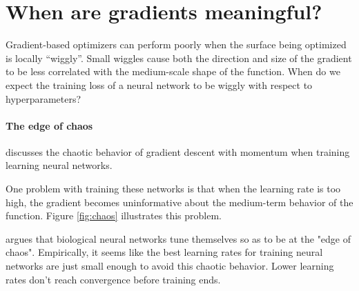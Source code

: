\documentclass{article}
\begin{document}
\section{When are gradients meaningful?}

Gradient-based optimizers can perform poorly when the surface being optimized is locally ``wiggly''.
Small wiggles cause both the direction and size of the gradient to be less correlated with the medium-scale shape of the function.
When do we expect the training loss of a neural network to be wiggly with respect to hyperparameters?

\paragraph{The edge of chaos}
\citet*[Chapter 4]{pearlmutter1996investigation} discusses the chaotic behavior of gradient descent with momentum when training learning neural networks.

One problem with training these networks is that when the learning rate is too high, the gradient becomes uninformative about the medium-term behavior of the function.
Figure \ref{fig:chaos} illustrates this problem.

\cite{pearlmutter2009sleep} argues that biological neural networks tune themselves so as to be at the "edge of chaos".
Empirically, it seems like the best learning rates for training neural networks are just small enough to avoid this chaotic behavior.
Lower learning rates don't reach convergence before training ends.
\end{document}
